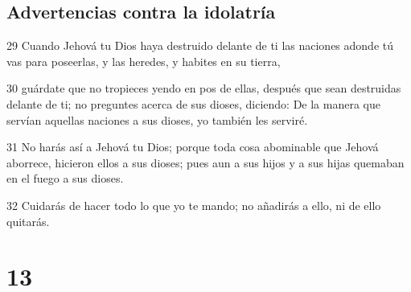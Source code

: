 \section{Advertencias contra la idolatría}

\par 29 Cuando Jehová tu Dios haya destruido delante de ti las naciones adonde tú vas para poseerlas, y las heredes, y habites en su tierra,
\par 30 guárdate que no tropieces yendo en pos de ellas, después que sean destruidas delante de ti; no preguntes acerca de sus dioses, diciendo: De la manera que servían aquellas naciones a sus dioses, yo también les serviré.
\par 31 No harás así a Jehová tu Dios; porque toda cosa abominable que Jehová aborrece, hicieron ellos a sus dioses; pues aun a sus hijos y a sus hijas quemaban en el fuego a sus dioses.
\par 32 Cuidarás de hacer todo lo que yo te mando; no añadirás a ello, ni de ello quitarás.

\chapter{13}

